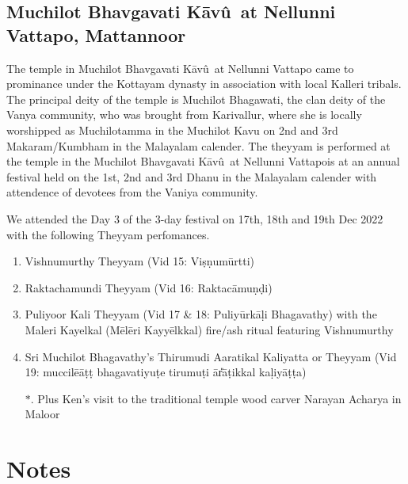 \documentclass[a4paper, 11pt]{article} %
\newcommand{\Kavu}[0]{K\={a}v\^{u}}
\begin{document}
\subsection{Muchilot Bhavgavati \Kavu\ at Nellunni Vattapo, Mattannoor}%
  \label{sub:Muchilot Bhavgavati \Kavu\ at Nellunni Vattapo, MattannoorMuchilot Bhavgavati \Kavu\ at Nellunni Vattapo, Mattannoor}
  

The temple in Muchilot Bhavgavati \Kavu\ at Nellunni Vattapo came to prominance under the Kottayam dynasty in association with local Kalleri tribals. 
The principal deity of the temple is Muchilot Bhagawati, the clan deity of the Vanya community, who was brought from Karivallur, where she is locally worshipped as Muchilotamma in the Muchilot Kavu on 2nd and 3rd Makaram/Kumbham in the Malayalam calender. 
The theyyam is performed at the temple in the Muchilot Bhavgavati \Kavu\ at Nellunni Vattapois at an annual festival held on the 1st, 2nd and 3rd Dhanu in the Malayalam calender with attendence of devotees from the Vaniya community.

We attended the Day 3 of the 3-day festival on 17th, 18th and 19th Dec 2022 with the following Theyyam perfomances.

\begin{enumerate}
\item Vishnumurthy Theyyam (Vid 15: Viṣṇum\={u}rtti) 
\item Raktachamundi Theyyam (Vid 16: Raktac\={a}muṇḍi) 
\item Puliyoor Kali Theyyam (Vid 17 \& 18: Puliy\={u}rk\={a}ḷi Bhagavathy) with the Maleri Kayelkal (Mēlēri Kayyēlkkal) fire/ash ritual featuring Vishnumurthy
\item Sri Muchilot Bhagavathy's Thirumudi Aaratikal Kaliyatta or Theyyam (Vid 19: muccilē\={a}\d{t}\d{t} bhagavatiyu\d{t}e tirumu\d{t}i \={a}\U{r}\={a}\d{t}ikkal kaḷiy\={a}\d{t}\d{t}a)
\item[$*$.] Plus Ken's visit to the traditional temple wood carver Narayan Acharya in Maloor
\end{enumerate}

\section{Notes}%
  \label{sec:Notes}
  
\end{document}
